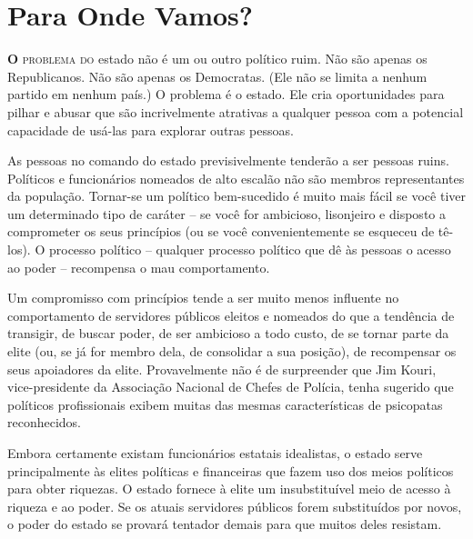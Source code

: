 
\chapter{Para Onde Vamos?}
\label{chap:6}

\lettrine[lines=2]{\textcolor{LettrineColor}{\textbf{O}}}{ problema do} estado não é um ou outro político ruim. Não são apenas os Republicanos. Não são apenas os Democratas. (Ele não se limita a nenhum partido em nenhum país.) O problema é o estado. Ele cria oportunidades para pilhar e abusar que são incrivelmente atrativas a qualquer pessoa com a potencial capacidade de usá-las para explorar outras pessoas.

As pessoas no comando do estado previsivelmente tenderão a ser pessoas ruins. Políticos e funcionários nomeados de alto escalão não são membros representantes da população. Tornar-se um político bem-sucedido é muito mais fácil se você tiver um determinado tipo de caráter -- se você for ambicioso, lisonjeiro e disposto a comprometer os seus princípios (ou se você convenientemente se esqueceu de tê-los). O processo político -- qualquer processo político que dê às pessoas o acesso ao poder -- recompensa o mau comportamento.

Um compromisso com princípios tende a ser muito menos influente no comportamento de servidores públicos eleitos e nomeados do que a tendência de transigir, de buscar poder, de ser ambicioso a todo custo, de se tornar parte da elite (ou, se já for membro dela, de consolidar a sua posição), de recompensar os seus apoiadores da elite. Provavelmente não é de surpreender que Jim Kouri, vice-presidente da Associação Nacional de Chefes de Polícia, tenha sugerido que políticos profissionais exibem muitas das mesmas características de psicopatas reconhecidos.

Embora certamente existam funcionários estatais idealistas, o estado serve principalmente às elites políticas e financeiras que fazem uso dos meios políticos para obter riquezas. O estado fornece à elite um insubstituível meio de acesso à riqueza e ao poder. Se os atuais servidores públicos forem substituídos por novos, o poder do estado se provará tentador demais para que muitos deles resistam.

